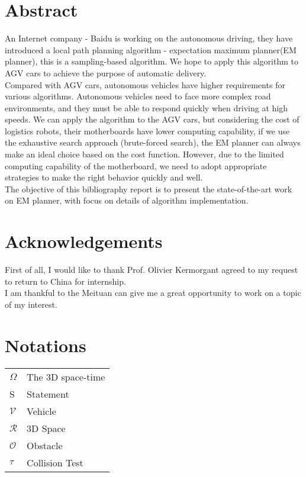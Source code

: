 \documentclass{report}
\begin{document}
   
 
  \section*{Abstract}
\par An Internet company - Baidu is working on the autonomous driving, they have introduced a local path planning algorithm - expectation maximum planner(EM planner), this is a sampling-based algorithm. We hope to apply this algorithm to AGV cars to achieve the purpose of automatic delivery.\\
\indent
Compared with AGV cars, autonomous vehicles have higher requirements for various algorithms. Autonomous vehicles need to face more complex road environments, and they must be able to respond quickly when driving at high speeds.
We can apply the algorithm to the AGV cars, but considering the cost of logistics robots, their motherboards have lower computing capability, if we use the exhaustive search approach (brute-forced search), the EM planner can always make an ideal choice based on the cost function. However, due to the limited computing capability of the motherboard, we need to adopt appropriate strategies to make the right behavior quickly and well.\\
\indent
The objective of this bibliography report is to present the state-of-the-art work on EM planner, with focus on details of algorithm implementation.


 \newpage
 
 \section*{Acknowledgements}
 First of all, I would like to thank Prof. Olivier Kermorgant agreed to my request to return to China for internship. \\
 \indent
 I am thankful to the Meituan can give me a great opportunity to work on a topic of my interest.
 
 \newpage
 
 \section*{Notations}
 \begin{tabular}{ll}
 $\Omega$ & The 3D space-time\\
  S & Statement\\
 $\mathcal V$ & Vehicle\\
 $\mathcal R$ & 3D Space\\
 $\mathcal O$ & Obstacle\\
 $\tau$ & Collision Test
 \end{tabular}
  \newpage
\end{document}
